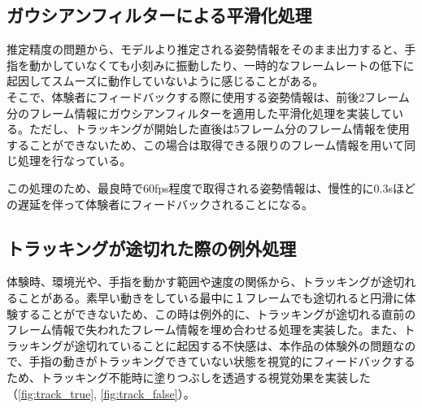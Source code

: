 \subsection{ガウシアンフィルターによる平滑化処理}
推定精度の問題から、モデルより推定される姿勢情報をそのまま出力すると、手指を動かしていなくても小刻みに振動したり、一時的なフレームレートの低下に起因してスムーズに動作していないように感じることがある。\\
そこで、体験者にフィードバックする際に使用する姿勢情報は、前後2フレーム分のフレーム情報にガウシアンフィルターを適用した平滑化処理を実装している。ただし、トラッキングが開始した直後は5フレーム分のフレーム情報を使用することができないため、この場合は取得できる限りのフレーム情報を用いて同じ処理を行なっている。


この処理のため、最良時で60fps程度で取得される姿勢情報は、慢性的に0.3sほどの遅延を伴って体験者にフィードバックされることになる。

\subsection{トラッキングが途切れた際の例外処理}
体験時、環境光や、手指を動かす範囲や速度の関係から、トラッキングが途切れることがある。素早い動きをしている最中に１フレームでも途切れると円滑に体験することができないため、この時は例外的に、トラッキングが途切れる直前のフレーム情報で失われたフレーム情報を埋め合わせる処理を実装した。また、トラッキングが途切れていることに起因する不快感は、本作品の体験外の問題なので、手指の動きがトラッキングできていない状態を視覚的にフィードバックするため、トラッキング不能時に塗りつぶしを透過する視覚効果を実装した（\ref{fig:track_true}, \ref{fig:track_false}）。

